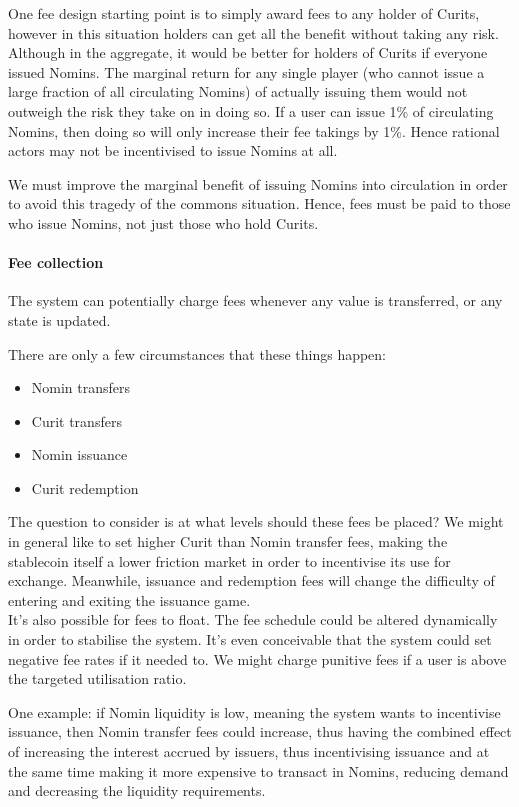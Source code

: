 One fee design starting point is to simply award fees to any holder of Curits, however in this situation holders can get all the benefit without taking any risk. Although in the aggregate, it would be better for holders of Curits if everyone issued Nomins. The marginal return for any single player (who cannot issue a large fraction of all circulating Nomins) of actually issuing them would not outweigh the risk they take on in doing so. If a user can issue 1\% of circulating Nomins, then doing so will only increase their fee takings by 1\%. Hence rational actors may not be incentivised to issue Nomins at all.

We must improve the marginal benefit of issuing Nomins into circulation in order to avoid this tragedy of the commons situation. Hence, fees must be paid to those who issue Nomins, not just those who hold Curits.

\paragraph{Fee collection}

The system can potentially charge fees whenever any value is transferred, or any state is updated.

There are only a few circumstances that these things happen:

\begin{itemize}
    \item Nomin transfers
    \item Curit transfers
    \item Nomin issuance
    \item Curit redemption
\end{itemize}

The question to consider is at what levels should these fees be placed? We might in general like to set higher Curit than Nomin transfer fees, making the stablecoin itself a lower friction market in order to incentivise its use for exchange. Meanwhile, issuance and redemption fees will change the difficulty of entering and exiting the issuance game. \\

It's also possible for fees to float. The fee schedule could be altered dynamically in order to stabilise the system. It's even conceivable that the system could set negative fee rates if it needed to. We might charge punitive fees if a user is above the targeted utilisation ratio.

One example: if Nomin liquidity is low, meaning the system wants to incentivise issuance, then Nomin transfer fees could increase, thus having the combined effect of increasing the interest accrued by issuers, thus incentivising issuance and at the same time making it more expensive to transact in Nomins,
reducing demand and decreasing the liquidity requirements. \\


